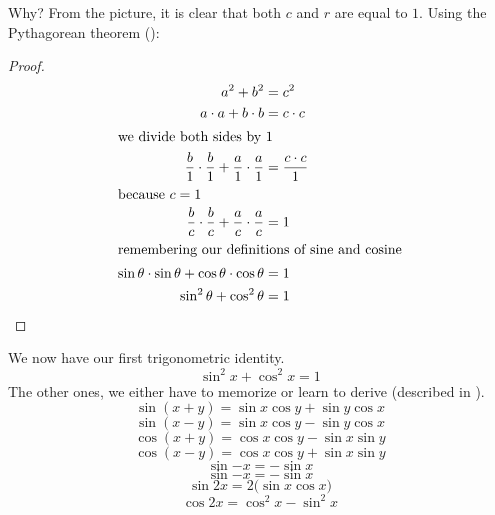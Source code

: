 Why? From the picture, it is clear that both $c$ and $r$ are equal to $1$. Using the Pythagorean theorem ():
\begin{proof}\begin{align*}
  a^2+b^2&=c^2\\
  a\cdot a + b \cdot b &= c \cdot c \\
  \intertext{we divide both sides by 1}
  \frac{b}{1}\cdot\frac{b}{1}+\frac{a}{1}\cdot\frac{a}{1}
  &=\frac{c \cdot c}{1}\\
  \intertext{because $c=1$}
  \frac{b}{c}\cdot\frac{b}{c}+\frac{a}{c}\cdot\frac{a}{c}
  &=1\\
  \intertext{remembering our definitions of sine and cosine}
  \sin\theta \cdot \sin\theta + \cos\theta \cdot \cos\theta &=1\\
  \sin^2\theta + \cos^2\theta &=1\qedhere
\end{align*}\end{proof}
We now have our first trigonometric identity.
\begin{equation}
  \sin^2x+\cos^2x=1
  \label{eq:pythtrig}
\end{equation}
The other ones, we either have to memorize or learn to derive (described in ).
\begin{equation}
  \sin{(x+y)} = \sin x \cos y + \sin y \cos x
\end{equation}
\begin{equation}
  \sin{(x-y)} = \sin x \cos y - \sin y \cos x
\end{equation}
\begin{equation}
  \cos(x+y)=\cos x \cos y - \sin x \sin y
  \label{eq:cosxpy}
\end{equation}
\begin{equation}
  \cos(x-y)=\cos x \cos y + \sin x \sin y
\end{equation}
\begin{equation}
  \sin{-x}=-\sin x
\end{equation}
\begin{equation}
  \sin{-x}=-\sin x
\end{equation}
\begin{equation}
  \sin{2x}=2 \big( \sin x \cos x \big)
\end{equation}
\begin{equation}
  \cos{2x}=\cos^2x-\sin^2x
\end{equation}

